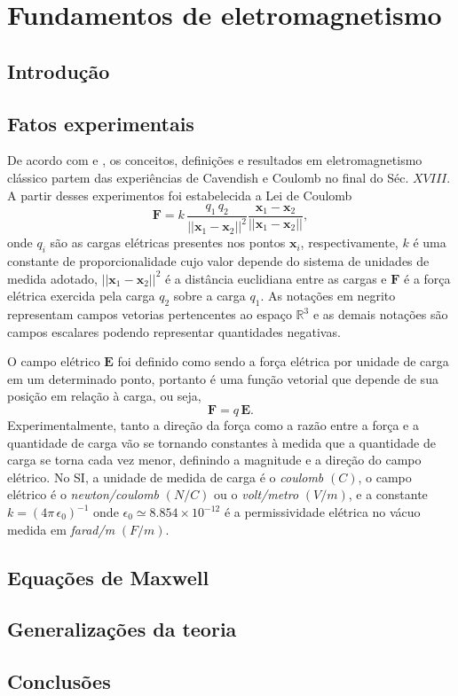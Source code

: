 \chapter{Fundamentos de eletromagnetismo}

\section{Introdução}

\section{Fatos experimentais}
De acordo com \cite{jackson_classical_1999} e \cite{sommerfeld_52} , os conceitos, definições e resultados em eletromagnetismo clássico partem das experiências de Cavendish e Coulomb no final do Séc. $XVIII$. A partir desses experimentos foi estabelecida a Lei de Coulomb
\begin{equation}
\textbf{F}=k\,\frac{q_1\,q_2}{||\textbf{x}_1-\textbf{x}_2||^2}\frac{\textbf{x}_1-\textbf{x}_2}{||\textbf{x}_1-\textbf{x}_2||},
\end{equation}
onde $q_i$ são as cargas elétricas presentes nos pontos $\textbf{x}_i$, respectivamente, $k$ é uma constante de proporcionalidade cujo valor depende do sistema de unidades de medida adotado, $||\textbf{x}_1-\textbf{x}_2||^2$ é a distância euclidiana entre as cargas e $\textbf{F}$ é a força elétrica exercida pela carga $q_2$ sobre a carga $q_1$. As notações em negrito representam campos vetorias pertencentes ao espaço $\mathbb{R}^3$ e as demais notações são campos escalares podendo representar quantidades negativas.

O campo elétrico $\textbf{E}$ foi definido como sendo a força elétrica por unidade de carga em um determinado ponto, portanto é uma função vetorial que depende de sua posição em relação à carga, ou seja,
\begin{equation}
\textbf{F}=q\,\textbf{E}.
\end{equation}
Experimentalmente, tanto a direção da força como a razão entre a força e a quantidade de carga vão se tornando constantes à medida que a quantidade de carga se torna cada vez menor, definindo a magnitude e a direção do campo elétrico. No SI, a unidade de medida de carga é o \textit{coulomb} $(C)$, o campo elétrico é o \textit{newton/coulomb} $(N/C)$ ou o \textit{volt/metro} $(V/m)$, e a constante $k=(4\pi\,\epsilon_0)^{-1}$ onde $\epsilon_0\simeq8.854\times10^{-12}$ é a permissividade elétrica no vácuo medida em \textit{farad/m} $(F/m)$. 

\section{Equações de Maxwell}

\section{Generalizações da teoria}

\section{Conclusões}